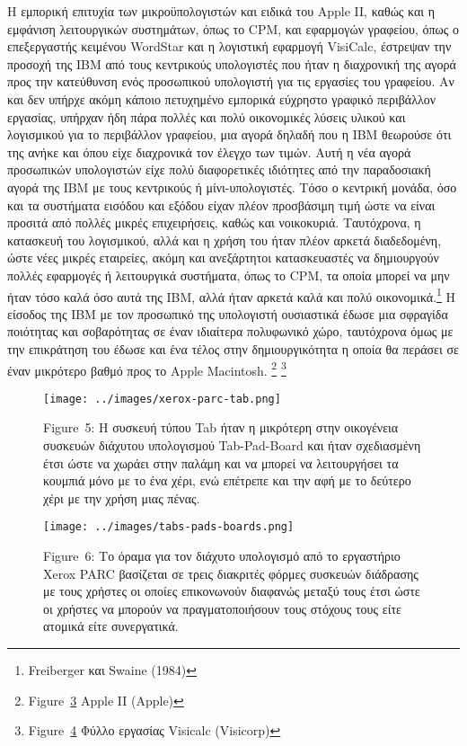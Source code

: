 \documentclass[
]{article}
\begin{document}
Η εμπορική επιτυχία των μικροϋπολογιστών και ειδικά του Apple II, καθώς
και η εμφάνιση λειτουργικών συστημάτων, όπως το CPΜ, και εφαρμογών
γραφείου, όπως ο επεξεργαστής κειμένου WordStar και η λογιστική εφαρμογή
VisiCalc, έστρεψαν την προσοχή της IBM από τους κεντρικούς υπολογιστές
που ήταν η διαχρονική της αγορά προς την κατεύθυνση ενός προσωπικού
υπολογιστή για τις εργασίες του γραφείου. Αν και δεν υπήρχε ακόμη κάποιο
πετυχημένο εμπορικά εύχρηστο γραφικό περιβάλλον εργασίας, υπήρχαν ήδη
πάρα πολλές και πολύ οικονομικές λύσεις υλικού και λογισμικού για το
περιβάλλον γραφείου, μια αγορά δηλαδή που η IBM θεωρούσε ότι της ανήκε
και όπου είχε διαχρονικά τον έλεγχο των τιμών. Αυτή η νέα αγορά
προσωπικών υπολογιστών είχε πολύ διαφορετικές ιδιότητες από την
παραδοσιακή αγορά της IBM με τους κεντρικούς ή μίνι-υπολογιστές. Τόσο ο
κεντρική μονάδα, όσο και τα συστήματα εισόδου και εξόδου είχαν πλέον
προσβάσιμη τιμή ώστε να είναι προσιτά από πολλές μικρές επιχειρήσεις,
καθώς και νοικοκυριά. Ταυτόχρονα, η κατασκευή του λογισμικού, αλλά και η
χρήση του ήταν πλέον αρκετά διαδεδομένη, ώστε νέες μικρές εταιρείες,
ακόμη και ανεξάρτητοι κατασκευαστές να δημιουργούν πολλές εφαρμογές ή
λειτουργικά συστήματα, όπως το CPM, τα οποία μπορεί να μην ήταν τόσο
καλά όσο αυτά της IBM, αλλά ήταν αρκετά καλά και πολύ
οικονομικά.\footnote{Freiberger και Swaine (1984)} Η είσοδος της IBM με
τον προσωπικό της υπολογιστή ουσιαστικά έδωσε μια σφραγίδα ποιότητας και
σοβαρότητας σε έναν ιδιαίτερα πολυφωνικό χώρο, ταυτόχρονα όμως με την
επικράτηση του έδωσε και ένα τέλος στην δημιουργικότητα η οποία θα
περάσει σε έναν μικρότερο βαθμό προς το Apple Macintosh. \footnote{Figure~\protect\hyperlink{fig:apple2}{3}
  Apple II (Apple)} \footnote{Figure~\protect\hyperlink{fig:visicalc}{4}
  Φύλλο εργασίας Visicalc (Visicorp)}

\leavevmode{}%
\begin{figure}
\hypertarget{fig:xerox-parc-tab}{%
\centering
\texttt{[image: ../images/xerox-parc-tab.png]}
\caption{Figure~5: Η συσκευή τύπου Tab ήταν η μικρότερη στην οικογένεια
συσκευών διάχυτου υπολογισμού Tab-Pad-Board και ήταν σχεδιασμένη έτσι
ώστε να χωράει στην παλάμη και να μπορεί να λειτουργήσει τα κουμπιά μόνο
με το ένα χέρι, ενώ επέτρεπε και την αφή με το δεύτερο χέρι με την χρήση
μιας πένας.}\label{fig:xerox-parc-tab}
}
\end{figure}

\leavevmode{}%
\begin{figure}
\hypertarget{fig:tabs-pads-boards}{%
\centering
\texttt{[image: ../images/tabs-pads-boards.png]}
\caption{Figure~6: Το όραμα για τον διάχυτο υπολογισμό από το εργαστήριο
Xerox PARC βασίζεται σε τρεις διακριτές φόρμες συσκευών διάδρασης με
τους χρήστες οι οποίες επικονωνούν διαφανώς μεταξύ τους έτσι ώστε οι
χρήστες να μπορούν να πραγματοποιήσουν τους στόχους τους είτε ατομικά
είτε συνεργατικά.}\label{fig:tabs-pads-boards}
}
\end{figure}
\end{document}
